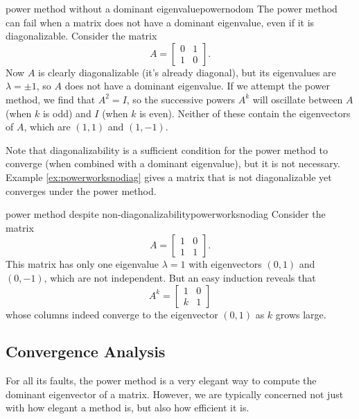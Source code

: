 \documentclass{article}
\begin{document}
\begin{example}{power method without a dominant eigenvalue}{powernodom}
  The power method can fail when a matrix does not have a dominant eigenvalue, even if it is diagonalizable. Consider the matrix
  \begin{equation*}
    A = \begin{bmatrix}0 & 1 \\ 1 & 0\end{bmatrix}.
  \end{equation*}
  Now $A$ is clearly diagonalizable (it's already diagonal), but its eigenvalues are $\lambda = \pm 1$, so $A$ does not have a dominant eigenvalue. If we attempt the power method, we find that $A^2 = I$, so the successive powers $A^k$ will oscillate between $A$ (when $k$ is odd) and $I$ (when $k$ is even). Neither of these contain the eigenvectors of $A$, which are $(1,1)$ and $(1,-1)$.
\end{example}

Note that diagonalizability is a sufficient condition for the power method to converge (when combined with a dominant eigenvalue), but it is not necessary. Example \ref{ex:powerworksnodiag} gives a matrix that is not diagonalizable yet converges under the power method.

\begin{example}{power method despite non-diagonalizability}{powerworksnodiag}
  Consider the matrix
  \begin{equation*}
    A = \begin{bmatrix}1 & 0 \\ 1 & 1\end{bmatrix}.
  \end{equation*}
  This matrix has only one eigenvalue $\lambda = 1$ with eigenvectors $(0,1)$ and $(0,-1)$, which are not independent. But an easy induction reveals that
  \begin{equation*}
    A^k = \begin{bmatrix}1 & 0 \\ k & 1\end{bmatrix}
  \end{equation*}
  whose columns indeed converge to the eigenvector $(0, 1)$ as $k$ grows large.
\end{example}

\subsection{Convergence Analysis}
For all its faults, the power method is a very elegant way to compute the dominant eigenvector of a matrix. However, we are typically concerned not just with how elegant a method is, but also how efficient it is.
\end{document}
